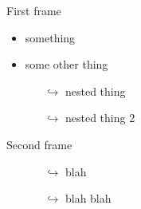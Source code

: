 \documentclass{beamer}
\begin{document}
\begin{frame}{First frame}
\begin{itemize}
    \item something
    \item some other thing
    \begin{itemize}
        \item[$\hookrightarrow$] nested thing
        \item[$\hookrightarrow$] nested thing 2
    \end{itemize}
\end{itemize}
\end{frame}

\begin{frame}{Second frame}
\begin{itemize}
\item[]
\begin{itemize}
    \item[$\hookrightarrow$] blah 
    \item[$\hookrightarrow$] blah blah
\end{itemize}
\end{itemize}
\end{frame}
\end{document}
